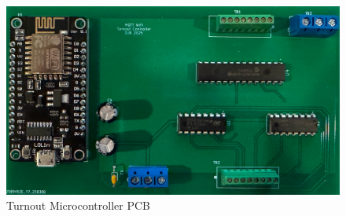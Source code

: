 \begin{figure}[H]
  \centering
    \includegraphics[scale=0.45]{turnout-board.jpg}
  \caption{Turnout Microcontroller PCB}
  \label{fig:turnout-board}
\end{figure}

